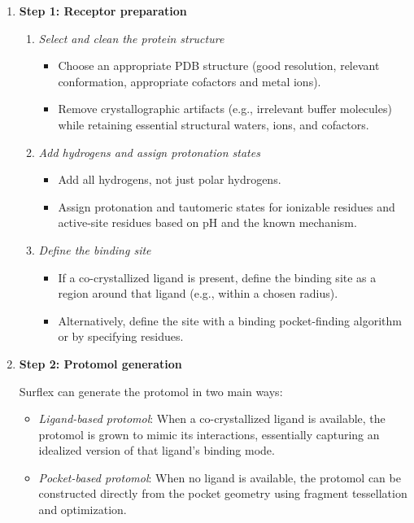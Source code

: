 \documentclass[12pt, a4paper]{article}
\begin{document}
\begin{enumerate}

\item \textbf{Step 1: Receptor preparation}

\begin{enumerate}
  \item \textit{Select and clean the protein structure}
  \begin{itemize}
    \item Choose an appropriate PDB structure (good resolution, relevant conformation, appropriate cofactors and metal ions).
    \item Remove crystallographic artifacts (e.g., irrelevant buffer molecules) while retaining essential structural waters, ions, and cofactors.
  \end{itemize}
  \item \textit{Add hydrogens and assign protonation states}
  \begin{itemize}
    \item Add all hydrogens, not just polar hydrogens.
    \item Assign protonation and tautomeric states for ionizable residues and active-site residues based on pH and the known mechanism.
  \end{itemize}
  \item \textit{Define the binding site}
  \begin{itemize}
    \item If a co-crystallized ligand is present, define the binding site as a region around that ligand (e.g., within a chosen radius).
    \item Alternatively, define the site with a binding pocket-finding algorithm or by specifying residues.
  \end{itemize}
\end{enumerate}

\item \textbf{Step 2: Protomol generation}

Surflex can generate the protomol in two main ways:\cite{CH7_Jain2003Surflex}
\begin{itemize}
  \item \textit{Ligand-based protomol}: When a co-crystallized ligand is available, the protomol is grown to mimic its interactions, essentially capturing an idealized version of that ligand's binding mode.
  \item \textit{Pocket-based protomol}: When no ligand is available, the protomol can be constructed directly from the pocket geometry using fragment tessellation and optimization.
\end{itemize}



\end{enumerate}
\end{document}
